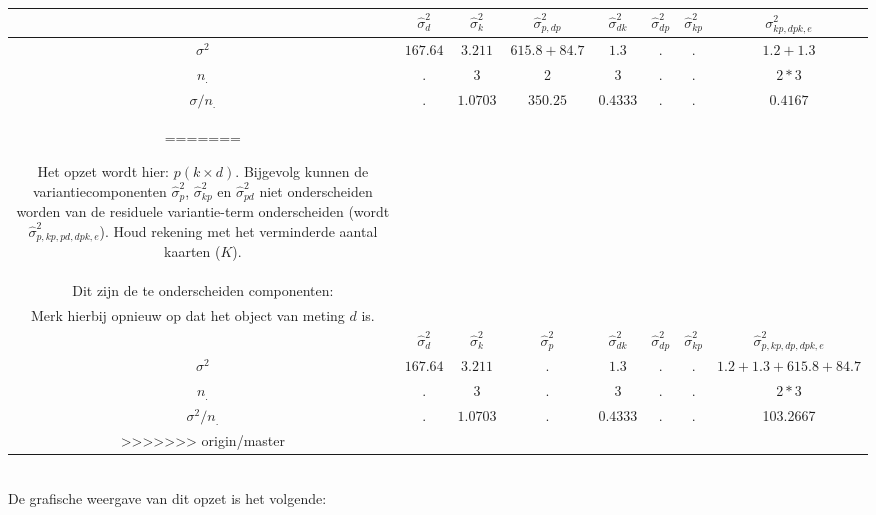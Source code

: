 {\begin{enumerate}
\begin{itemize}
	\begin{tabular}{|c|c|c|c|c|c|c|c|} \hline
	 & $ \hat{\sigma}^2_{d} $ & $ \hat{\sigma}^2_{k} $& $ \hat{\sigma}^2_{p, dp} $ & $ \hat{\sigma}^2_{dk} $ & $ \hat{\sigma}^2_{dp} $ & $ \hat{\sigma}^2_{kp} $ &
	 $\sigma^2_{kp, dpk, e}$ \\ \hline
	$\sigma^2$  			& $167.64$ 			    & $ 3.211 $  	& $615.8+84.7$   & $1.3$ & $ . $	& $ . $& $ 1.2 + 1.3$ \\
	$n_.$ 				& . 					& $3$			& 2	  & $ 3$		  	 & $ . $ 	& $ . $&  $2 *3$ \\ \hline
	$\sigma / n_.$      & .						& $1.0703 $		& $350.25$   & $0.4333$		 & $.$		& $ . $&  $0.4167$ \\ \hline
=======
	\item Het opzet wordt hier: $p\left(k\times d\right)$. Bijgevolg kunnen de variantiecomponenten $\hat{\sigma}^2_p$, $\hat{\sigma}^2_{kp}$ en $\hat{\sigma}^2_{pd}$ niet onderscheiden worden van de residuele variantie-term onderscheiden (wordt $\hat{\sigma}^2_{p, kp, pd, dpk, e}$). Houd rekening met het verminderde aantal kaarten ($K$).\\Dit zijn de te onderscheiden componenten:\\ Merk hierbij opnieuw op dat het object van meting $d$ is. \\

	\begin{tabular}{|c|c|c|c|c|c|c|c|} \hline
	 & $ \hat{\sigma}^2_{d} $ & $ \hat{\sigma}^2_{k} $& $ \hat{\sigma}^2_{p} $ & $ \hat{\sigma}^2_{dk} $ & $ \hat{\sigma}^2_{dp} $ & $ \hat{\sigma}^2_{kp} $ &
	 $\hat{\sigma}^2_{p, kp, dp, dpk, e}$ \\ \hline
	$\sigma^2$  			& $167.64$ 			& $ 3.211 $  	& . 	  & $1.3$				 & $ . $	& $ . $& $ 1.2 + 1.3 +  615.8 +84.7$ \\
	$n_.$ 				& . 					& $3$			& .	  & $ 3$		  		 & $ . $ 	& $ . $&  $2 *3$ \\ \hline
	$\sigma^2 / n_.$      & .						& $1.0703 $		& .   & $0.4333$			  	 & $.$	& $ . $&  103.2667 \\ \hline
>>>>>>> origin/master
	\end{tabular} \\
	De grafische weergave van dit opzet is het volgende:\\

	
\end{itemize}


\end{enumerate}}
